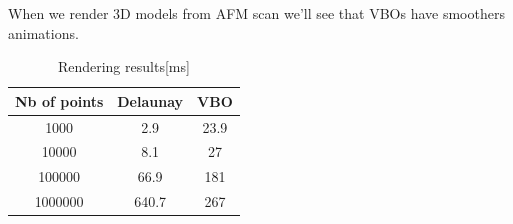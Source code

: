 When we render 3D models from AFM scan we'll see that VBOs have smoothers animations.


\begin{table}[ht]
\caption{Rendering results[ms]} %
\centering %
\begin{tabular}{c c c} %
\hline\hline %
 Nb of points & Delaunay & VBO \\ [0.5ex] %
\hline %

1000 & 2.9 & 23.9 \\
10000 & 8.1	&	27 	\\
100000 & 66.9 & 181 \\
1000000 & 640.7	& 267 \\[1ex]


\hline %
\end{tabular}
\label{table:nonlin} %
\end{table}


